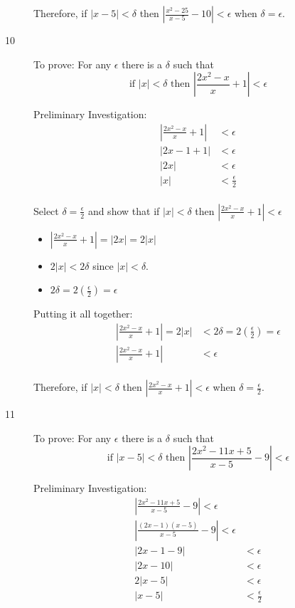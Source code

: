 \documentclass{exam}
\begin{document}
\begin{description}
  Therefore, if $|x - 5| < \delta$ then $\left| \frac{x^2 - 25}{x-5} - 10 \right| < \epsilon$ when $\delta = \epsilon$.

  \pagebreak

  \item[10]
  To prove: For any $\epsilon$ there is a $\delta$ such that 
  \[
    \text{if } |x| < \delta \text{ then } \left|\frac{2x^2 - x}{x} + 1\right| < \epsilon
  \]

  Preliminary Investigation:
  \begin{align*}
    \left|\frac{2x^2 - x}{x} + 1\right| &< \epsilon \\
    |2x - 1 + 1| &< \epsilon \\
    |2x| &< \epsilon \\
    |x| &< \frac{\epsilon}{2} \\
  \end{align*}

  Select $\delta = \frac{\epsilon}{2}$ and show that if $|x| < \delta$ then $\left|\frac{2x^2 - x}{x} + 1\right| < \epsilon$

  \begin{itemize}
    \item $\left|\frac{2x^2 - x}{x} + 1\right| = |2x| = 2|x|$
    \item $2|x| < 2 \delta$ since $|x| < \delta$.
    \item $2 \delta = 2 \left( \frac{\epsilon}{2} \right) = \epsilon$
  \end{itemize}

  Putting it all together:
  \begin{align*}
    \left|\frac{2x^2 - x}{x} + 1\right| = 2|x| &< 2 \delta = 2 \left( \frac{\epsilon}{2} \right) = \epsilon \\ 
    \left|\frac{2x^2 - x}{x} + 1\right| &< \epsilon \\ 
  \end{align*}

  Therefore, if $|x| < \delta$ then $\left|\frac{2x^2 - x}{x} + 1\right| < \epsilon$ when $\delta = \frac{\epsilon}{2}$.

  \pagebreak

  \item[11]
  To prove: For any $\epsilon$ there is a $\delta$ such that 
  \[
    \text{if } |x - 5| < \delta \text{ then } \left|\frac{2x^2 - 11x + 5}{x-5} -9 \right| < \epsilon
  \]

  Preliminary Investigation:
  \begin{align*}
    \left|\frac{2x^2 - 11x + 5}{x-5} -9 \right| < \epsilon \\
    \left|\frac{(2x - 1)(x-5)}{x-5} -9 \right| < \epsilon \\
    |2x - 1 - 9| &< \epsilon \\
    |2x - 10| &< \epsilon \\
    2|x - 5| &< \epsilon \\
    |x - 5| &< \frac{\epsilon}{2} \\
  \end{align*}


\end{description}
\end{document}
